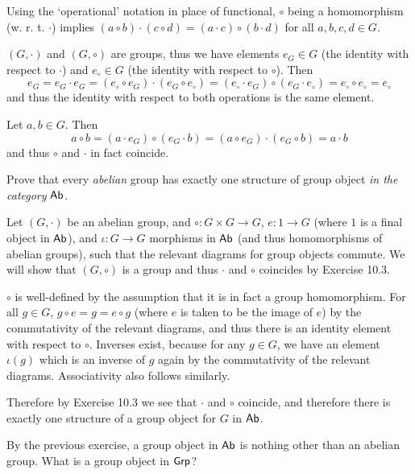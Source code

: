 \begin{solution}
	Using the `operational' notation in place of functional, $\circ$ being a homomorphism (w. r. t. $\cdot$) implies $(a \circ b) \cdot (c \circ d) = (a \cdot c) \circ (b \cdot d)$ for all $a, b, c, d \in G$.
	
	$(G, \cdot)$ and $(G, \circ)$ are groups, thus we have elements $e_G \in G$ (the identity with respect to $\cdot$) and $e_{\circ} \in G$ (the identity with respect to $\circ$). Then
	\[
		e_G = e_G \cdot e_G = (e_{\circ} \circ e_G) \cdot (e_G \circ e_{\circ}) = (e_{\circ} \cdot e_G) \circ (e_G \cdot e_{\circ}) = e_{\circ} \circ e_{\circ} = e_{\circ}
	\]
	and thus the identity with respect to both operations is the same element.
	
	Let $a, b \in G$. Then
	\[
		a \circ b = (a \cdot e_G) \circ (e_G \cdot b) = (a \circ e_G) \cdot (e_G \circ b) = a \cdot b
	\]
	and thus $\circ$ and $\cdot$ in fact coincide.
\end{solution}

\begin{problem}
	Prove that every \emph{abelian} group has exactly one structure of group object \emph{in the category} $\mathsf{Ab}$.
\end{problem}

\begin{solution}
	Let $(G, \cdot)$ be an abelian group, and $\circ: G \times G \to G$, $e: 1 \to G$ (where $1$ is a final object in $\mathsf{Ab}$), and $\iota: G \to G$ morphisms in $\mathsf{Ab}$ (and thus homomorphisms of abelian groups), such that the relevant diagrams for group objects commute. We will show that $(G, \circ)$ is a group and thus $\cdot$ and $\circ$ coincides by Exercise 10.3.
	
	$\circ$ is well-defined by the assumption that it is in fact a group homomorphism. For all $g \in G$, $g \circ e = g = e \circ g$ (where $e$ is taken to be the image of $e$) by the commutativity of the relevant diagrams, and thus there is an identity element with respect to $\circ$. Inverses exist, because for any $g \in G$, we have an element $\iota(g)$ which is an inverse of $g$ again by the commutativity of the relevant diagrams. Associativity also follows similarly.
	
	Therefore by Exercise 10.3 we see that $\cdot$ and $\circ$ coincide, and therefore there is exactly one structure of a group object for $G$ in $\mathsf{Ab}$.
\end{solution}

\begin{problem}
	By the previous exercise, a group object in $\mathsf{Ab}$ is nothing other than an abelian group. What is a group object in $\mathsf{Grp}$?
\end{problem}

